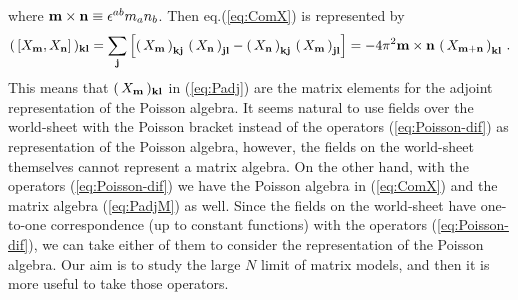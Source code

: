 \documentclass[a4paper,12pt]{article}
\begin{document}
where ${\bf m}\times{\bf n} \equiv\epsilon^{ab} m_a n_b$.
Then eq.(\ref{eq:ComX}) is represented by
\begin{equation}
 (\,[X_{\bf m},X_{\bf n}]\,)_{\bf kl}=
 \sum_{\bf j} \left[
  \left(\,X_{\bf m}\,\right)_{\bf kj}\,
    \left(\,X_{\bf n}\,\right)_{\bf jl}
  - \left(\,X_{\bf n}\,\right)_{\bf kj}\,
    \left(\,X_{\bf m}\,\right)_{\bf jl}\right]
  = -4\pi^2 {\bf m}\times{\bf n}\,
	\left(\,X_{\bf m+n}\,\right)_{\bf kl}\,.\label{eq:PadjM}
\end{equation}
This means that $(\,X_{\bf m}\,)_{\bf kl}$ in (\ref{eq:Padj}) are the
matrix elements for the adjoint representation of the Poisson algebra.
It seems natural to use fields over the world-sheet with the Poisson
bracket instead of the operators (\ref{eq:Poisson-dif}) as
representation of the Poisson algebra, however, the fields on the
world-sheet themselves cannot represent a matrix algebra.
On the other hand, with the operators (\ref{eq:Poisson-dif}) we have
the Poisson algebra in (\ref{eq:ComX}) and the matrix algebra
(\ref{eq:PadjM}) as well.
Since the fields on the world-sheet have one-to-one correspondence (up
to constant functions) with the operators (\ref{eq:Poisson-dif}), we
can take either of them to consider the representation of the Poisson
algebra.
Our aim is to study the large $N$ limit of matrix models, and then it
is more useful to take those operators.
\end{document}
